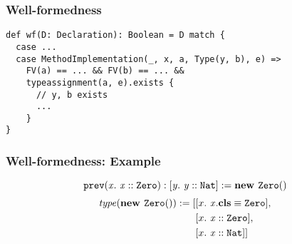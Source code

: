 \begin{frame}[fragile]
\frametitle{Well-formedness}
\begin{prooftree}
\end{prooftree}
\vfill
\begin{lstlisting}[basicstyle=\footnotesize]
def wf(D: Declaration): Boolean = D match {
  case ...
  case MethodImplementation(_, x, a, Type(y, b), e) =>
    FV(a) == ... && FV(b) == ... &&
    typeassignment(a, e).exists {
      // y, b exists
      ...
    }
}
\end{lstlisting}
\end{frame}

\begin{frame}
\frametitle{Well-formedness: Example}
\begin{prooftree}
\end{prooftree}
\[
\mImpl{\texttt{prev}}{x}{\instOf{x}{\texttt{Zero}}}{\type{y}{\instOf{y}{\texttt{Nat}}}}{\newInstNoArgs{\texttt{Zero}}}
\]
\vfill
\begin{align*}
\mIt{type}(\newInstNoArgs{\texttt{Zero}}) := [&\type{x}{\instBy{x}{\texttt{Zero}}},\\
&\type{x}{\instOf{x}{\texttt{Zero}}},\\
&\type{x}{\instOf{x}{\texttt{Nat}}}]
\end{align*}
\end{frame}
